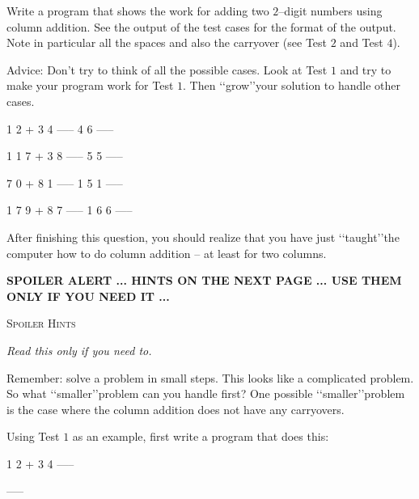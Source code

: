 Write a program that shows the work for adding two $2$--digit numbers using
column addition. See the output of the test cases for the format of the output.
Note in particular all the spaces and also the carryover (see Test $2$ and
Test $4$).

Advice: Don't try to think of all the possible cases. Look at Test $1$ and try
to make your program work for Test $1$. Then \lq\lq grow\rq\rq your solution to
handle other cases.

\resett
\nextt
\begin{console}[commandchars=\\\{\}]
  1 2
+ 3 4
-----
  4 6
-----
\end{console}

\nextt
\begin{console}[commandchars=\\\{\}]
  1
  1 7
+ 3 8
-----
  5 5
-----
\end{console}

\nextt
\begin{console}[commandchars=\\\{\}]
  7 0
+ 8 1
-----
1 5 1
-----
\end{console}

\nextt
\begin{console}[commandchars=\\\{\}]
  1
  7 9
+ 8 7
-----
1 6 6
-----
\end{console}

After finishing this question, you should realize that you have just 
\lq\lq taught\rq\rq the computer how to do column addition -- at least for two
columns.




{\bf SPOILER ALERT ... HINTS ON THE NEXT PAGE ... USE THEM ONLY IF YOU NEED IT ...}

\newpage

\textsc{Spoiler Hints}

{\it Read this only if you need to.}

Remember: solve a problem in small steps. This looks like a complicated 
problem. So what \lq\lq smaller\rq\rq problem can you handle first? One
possible \lq\lq smaller\rq\rq problem is the case where the column addition
does not have any carryovers.

Using Test $1$ as an example, first write a program that does this:
\begin{console}[commandchars=\\\{\}]
  1 2
+ 3 4
-----
   
-----
\end{console}

